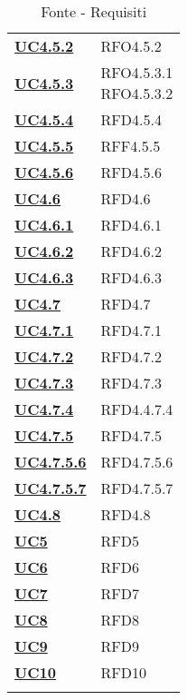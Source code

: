 \begin{longtable}[H]{| >{\centering\bfseries}p{8cm} | >{\centering\arraybackslash}p{8cm} |}
    \hyperref[par:uc4.5.2]{UC4.5.2} & RFO4.5.2\\

    \hyperref[par:uc4.5.3]{UC4.5.3} & \makecell{
        RFO4.5.3.1 \\
        RFO4.5.3.2} \\

    \hyperref[par:uc4.5.4]{UC4.5.4} & RFD4.5.4 \\

    \hyperref[par:uc4.5.5]{UC4.5.5} & RFF4.5.5 \\

    \hyperref[par:uc4.5.6]{UC4.5.6} & RFD4.5.6 \\

    \hyperref[ssub:uc4.6]{UC4.6} & RFD4.6 \\

    \hyperref[par:uc4.6.1]{UC4.6.1} & RFD4.6.1 \\

    \hyperref[par:uc4.6.2]{UC4.6.2} & RFD4.6.2 \\

    \hyperref[par:uc4.6.3]{UC4.6.3} & RFD4.6.3 \\


    \hyperref[ssub:uc4.7]{UC4.7} & RFD4.7 \\

    \hyperref[par:uc4.7.1]{UC4.7.1} & RFD4.7.1 \\

    \hyperref[par:uc4.7.2]{UC4.7.2} & RFD4.7.2 \\

    \hyperref[par:uc4.7.3]{UC4.7.3} & RFD4.7.3 \\

    \hyperref[par:uc4.7.4]{UC4.7.4} & RFD4.4.7.4 \\

    \hyperref[par:uc4.7.5]{UC4.7.5} & RFD4.7.5 \\

    \hyperref[spar:uc4.7.5.6]{UC4.7.5.6} & RFD4.7.5.6 \\

    \hyperref[spar:uc4.7.5.7]{UC4.7.5.7} & RFD4.7.5.7 \\

    \hyperref[ssub:uc4.8]{UC4.8} & RFD4.8 \\

    \hyperref[sub:uc5]{UC5} & RFD5 \\

    \hyperref[sub:uc6]{UC6} & RFD6 \\

    \hyperref[sub:uc7]{UC7} & RFD7 \\

    \hyperref[sub:uc8]{UC8} & RFD8 \\

    \hyperref[sub:uc9]{UC9} & RFD9 \\

    \hyperref[sub:uc10]{UC10} & RFD10 \\

    \caption{Fonte - Requisiti}
    \label{tab:fonte_requisiti}
\end{longtable}
